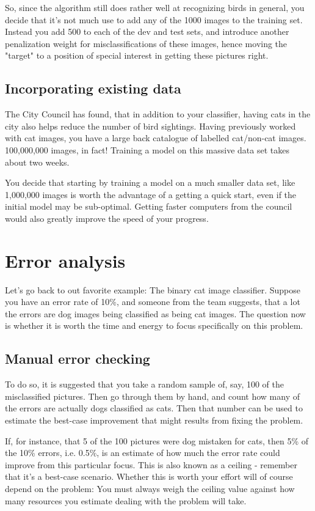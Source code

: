 \documentclass[12pt, a4paper]{article}
\numberwithin{equation}{section}
\begin{document}
So, since the algorithm still does rather well at recognizing birds in general, you decide that it's not much use to add any of the 1000 images to the training set. Instead you add 500 to each of the dev and test sets, and introduce another penalization weight for misclassifications of these images, hence moving the "target" to a position of special interest in getting these pictures right.

\subsection{Incorporating existing data}
The City Council has found, that in addition to your classifier, having cats in the city also helps reduce the number of bird sightings. Having previously worked with cat images, you have a large back catalogue of labelled cat/non-cat images. 100,000,000 images, in fact! Training a model on this massive data set takes about two weeks.

You decide that starting by training a model on a much smaller data set, like 1,000,000 images is worth the advantage of a getting a quick start, even if the initial model may be sub-optimal. Getting faster computers from the council would also greatly improve the speed of your progress.


\section{Error analysis}
Let's go back to out favorite example: The binary cat image classifier. Suppose you have an error rate of 10\%, and someone from the team suggests, that a lot the errors are dog images being classified as being cat images. The question now is whether it is worth the time and energy to focus specifically on this problem.

\subsection{Manual error checking}
To do so, it is suggested that you take a random sample of, say, 100 of the misclassified pictures. Then go through them by hand, and count how many of the errors are actually dogs classified as cats. Then that number can be used to estimate the best-case improvement that might results from fixing the problem.

If, for instance, that 5 of the 100 pictures were dog mistaken for cats, then 5\% of the 10\% errors, i.e. 0.5\%, is an estimate of how much the error rate could improve from this particular focus. This is also known as a ceiling - remember that it's a best-case scenario. Whether this is worth your effort will of course depend on the problem: You must always weigh the ceiling value against how many resources you estimate dealing with the problem will take.
\end{document}
